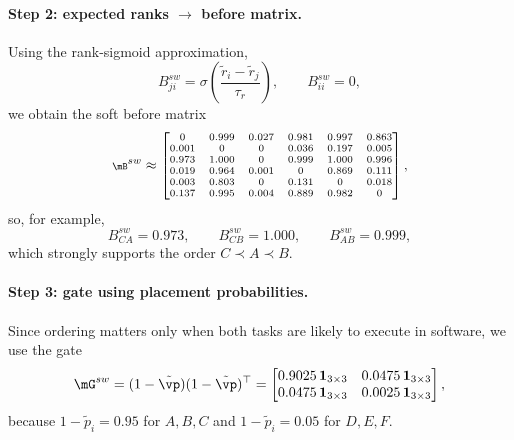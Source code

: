 \paragraph{\textbf{Step 2: expected ranks \(\rightarrow\) before matrix.}}
Using the rank-sigmoid approximation,
\begin{equation}
B^{sw}_{ji}
=
\sigma\!\left(\frac{\tilde r_i-\tilde r_j}{\tau_r}\right),
\qquad
B^{sw}_{ii}=0,
\end{equation}
we obtain the soft before matrix
\begingroup
\setlength{\arraycolsep}{3pt}
\begin{equation}
\scriptsize
\mB^{sw}\approx
\begin{bmatrix}
0     & 0.999 & 0.027 & 0.981 & 0.997 & 0.863\\
0.001 & 0     & 0     & 0.036 & 0.197 & 0.005\\
0.973 & 1.000 & 0     & 0.999 & 1.000 & 0.996\\
0.019 & 0.964 & 0.001 & 0     & 0.869 & 0.111\\
0.003 & 0.803 & 0     & 0.131 & 0     & 0.018\\
0.137 & 0.995 & 0.004 & 0.889 & 0.982 & 0
\end{bmatrix},
\end{equation}
\endgroup
so, for example,
\[
B^{sw}_{CA}=0.973,\qquad B^{sw}_{CB}=1.000,\qquad B^{sw}_{AB}=0.999,
\]
which strongly supports the order \(C \prec A \prec B\).

\paragraph{\textbf{Step 3: gate using placement probabilities.}}
Since ordering matters only when both tasks are likely to execute in software, we use the gate
\begin{equation}
\mG^{sw}=(1-\tilde{\vp})(1-\tilde{\vp})^\top
=
\begin{bmatrix}
0.9025\,\mathbf{1}_{3\times 3} & 0.0475\,\mathbf{1}_{3\times 3}\\
0.0475\,\mathbf{1}_{3\times 3} & 0.0025\,\mathbf{1}_{3\times 3}
\end{bmatrix},
\end{equation}
because \(1-\tilde p_i=0.95\) for \(A,B,C\) and \(1-\tilde p_i=0.05\) for \(D,E,F\).

